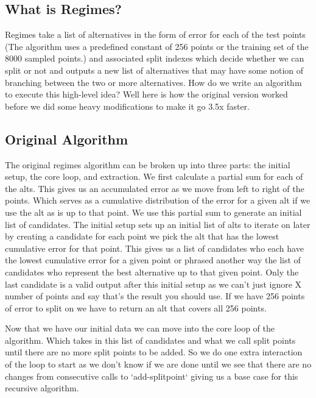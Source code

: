 \documentclass{article}
\begin{document}
\subsection{What is Regimes?}

Regimes take a list of alternatives in the form of error for each of the test points (The algorithm uses a predefined constant of 256 points or the training set of the 8000 sampled points.) and associated split indexes which decide whether we can split or not and outputs a new list of alternatives that may have some notion of branching between the two or more alternatives. How do we write an algorithm to execute this high-level idea? Well here is how the original version worked before we did some heavy modifications to make it go 3.5x faster.

\subsection{Original Algorithm}

The original regimes algorithm can be broken up into three parts: the initial setup, the core loop, and extraction. We first calculate a partial sum for each of the alts. This gives us an accumulated error as we move from left to right of the points. Which serves as a cumulative distribution of the error for a given alt if we use the alt as is up to that point. We use this partial sum to generate an initial list of candidates. The initial setup sets up an initial list of alts to iterate on later by creating a candidate for each point we pick the alt that has the lowest cumulative error for that point. This gives us a list of candidates who each have the lowest cumulative error for a given point or phrased another way the list of candidates who represent the best alternative up to that given point. Only the last candidate is a valid output after this initial setup as we can’t just ignore X number of points and say that’s the result you should use. If we have 256 points of error to split on we have to return an alt that covers all 256 points.

Now that we have our initial data we can move into the core loop of the algorithm. Which takes in this list of candidates and what we call split points until there are no more split points to be added. So we do one extra interaction of the loop to start as we don’t know if we are done until we see that there are no changes from consecutive calls to `add-splitpoint` giving us a base case for this recursive algorithm.
\end{document}
